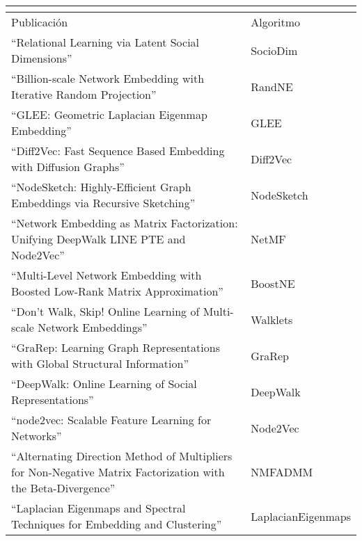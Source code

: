 \begin{longtable}
    \centering 
\label{table:neighNodeEmbedding}
    \begin{tabular}{ |p{}|p{}|  }
    \hline
    \multicolumn{2}{|c|}{ \texit{Embeddings de nodos basados en el vecindario} } \\
    \hline
    Publicación & Algoritmo  \\
    \hline
    “Relational Learning via Latent Social Dimensions” \cite{tang_relational_2009} & SocioDim \\
    \hline
    “Billion-scale Network Embedding with Iterative Random Projection” \cite{zhang_billion-scale_2018} & RandNE \\
    \hline
    “GLEE: Geometric Laplacian Eigenmap Embedding” \cite{torres_glee_2020} & GLEE \\
    \hline
    “Diff2Vec: Fast Sequence Based Embedding with Diffusion Graphs” \cite{cornelius_fast_2018} & Diff2Vec \\
    \hline
    “NodeSketch: Highly-Efficient Graph Embeddings via Recursive Sketching” \cite{yang_nodesketch_2019} & NodeSketch \\
    \hline
    “Network Embedding as Matrix Factorization: Unifying DeepWalk LINE PTE and Node2Vec” \cite{qiu_network_2018} & NetMF   \\
    \hline
    “Multi-Level Network Embedding with Boosted Low-Rank Matrix Approximation” \cite{li_multi-level_2019} & BoostNE  \\
    \hline
    “Don’t Walk, Skip! Online Learning of Multi-scale Network Embeddings” \cite{perozzi_dont_2017} & Walklets  \\
    \hline
    “GraRep: Learning Graph Representations with Global Structural Information” \cite{cao_grarep_2015} & GraRep \\
    \hline
    “DeepWalk: Online Learning of Social Representations” \cite{perozzi_deepwalk_2014} & DeepWalk \\
    \hline
    “node2vec: Scalable Feature Learning for Networks” \cite{grover_node2vec_2016} & Node2Vec \\
    \hline
    “Alternating Direction Method of Multipliers for Non-Negative Matrix Factorization with the Beta-Divergence” \cite{sun_alternating_2014} & NMFADMM \\
    \hline
    “Laplacian Eigenmaps and Spectral Techniques for Embedding and Clustering” \cite{dietterich_laplacian_2002} & LaplacianEigenmaps \\
    \hline
    \end{tabular}
\end{longtable}



